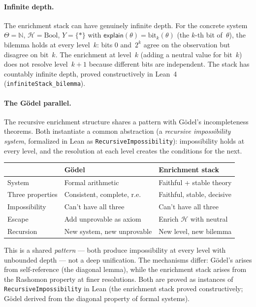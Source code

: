 \documentclass[11pt,a4paper]{article}
\newcommand{\sH}{\mathcal{H}}
\begin{document}
\paragraph{Infinite depth.}
The enrichment stack can have genuinely infinite depth. For the concrete system $\Theta = \mathbb{N}$, $\sH = \text{Bool}$, $Y = \{*\}$ with $\mathsf{explain}(\theta) = \text{bit}_k(\theta)$ (the $k$-th bit of~$\theta$), the bilemma holds at every level~$k$: bits 0 and~$2^k$ agree on the observation but disagree on bit~$k$. The enrichment at level~$k$ (adding a neutral value for bit~$k$) does not resolve level~$k+1$ because different bits are independent. The stack has countably infinite depth, proved constructively in Lean~4 (\texttt{infiniteStack\_bilemma}).

\paragraph{The Gödel parallel.}
The recursive enrichment structure shares a pattern with Gödel's incompleteness theorems. Both instantiate a common abstraction (a \emph{recursive impossibility system}, formalized in Lean as \texttt{RecursiveImpossibility}): impossibility holds at every level, and the resolution at each level creates the conditions for the next.

\begin{center}
\begin{tabular}{@{}lll@{}}
\toprule
 & \textbf{Gödel} & \textbf{Enrichment stack} \\
\midrule
System & Formal arithmetic & Faithful + stable theory \\
Three properties & Consistent, complete, r.e. & Faithful, stable, decisive \\
Impossibility & Can't have all three & Can't have all three \\
Escape & Add unprovable as axiom & Enrich $\sH$ with neutral \\
Recursion & New system, new unprovable & New level, new bilemma \\
\bottomrule
\end{tabular}
\end{center}

This is a shared \emph{pattern} --- both produce impossibility at every level with unbounded depth --- not a deep unification. The mechanisms differ: Gödel's arises from self-reference (the diagonal lemma), while the enrichment stack arises from the Rashomon property at finer resolutions. Both are proved as instances of \texttt{RecursiveImpossibility} in Lean (the enrichment stack proved constructively; Gödel derived from the diagonal property of formal systems).
\end{document}
